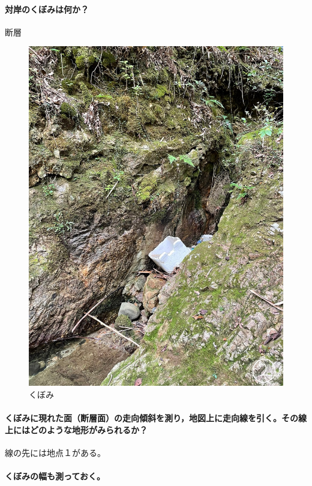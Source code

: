 \documentclass[uplatex,b5paper]{jsreport}
\begin{document}
      \paragraph{対岸のくぼみは何か？}
      断層
      \begin{figure}[h]
        \begin{center}
          \includegraphics[scale=0.1]{files/地学実習/地点2_窪み.jpg}
          \caption{くぼみ}
        \end{center}
      \end{figure}
      \paragraph{くぼみに現れた面（断層面）の走向傾斜を測り，地図上に走向線を引く。その線上にはどのような地形がみられるか？}
      線の先には地点１がある。
      \paragraph{くぼみの幅も測っておく。}
\end{document}
